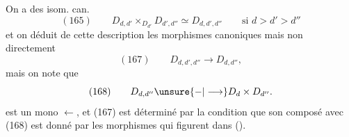 On a des isom. can.
\[
(165)\qquad D_{d,d'}\times_{D_{d'}}D_{d',d''}\simeq D_{d,d',d''}\qquad\text{si }d>d'>d''
\]
et on  déduit de cette description les morphismes canoniques
mais non directement 
\[
(167)\qquad D_{d,d',d''}\longrightarrow D_{d,d''},
\]
mais on note que
\[
(168)\qquad D_{d,d''}\unsure{-|\longrightarrow}D_d\times D_{d''}.
\]
est un mono $\leftarrow$, et (167) est déterminé par la condition que son composé avec (168) est donné par les morphismes
qui figurent dans ().

